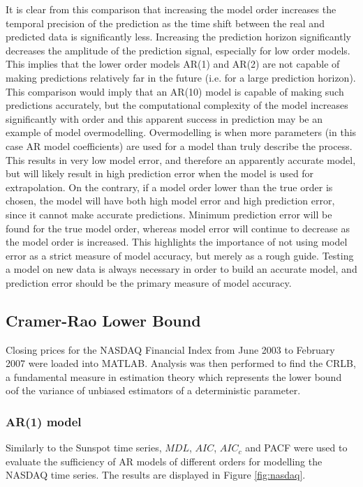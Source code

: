 \noindent
It is clear from this comparison that increasing the model order increases the temporal precision of the prediction as the time shift between the real and predicted data is significantly less. Increasing the prediction horizon significantly decreases the amplitude of the prediction signal, especially for low order models. This implies that the lower order models AR(1) and AR(2) are not capable of making predictions relatively far in the future (i.e. for a large prediction horizon). This comparison would imply that an AR(10) model is capable of making such predictions accurately, but the computational complexity of the model increases significantly with order and this apparent success in prediction may be an example of model overmodelling. Overmodelling is when more parameters (in this case AR model coefficients) are used for a model than truly describe the process. This results in very low model error, and therefore an apparently accurate model, but will likely result in high prediction error when the model is used for extrapolation. On the contrary, if a model order lower than the true order is chosen, the model will have both high model error and high prediction error, since it cannot make accurate predictions. Minimum prediction error will be found for the true model order, whereas model error will continue to decrease as the model order is increased. This highlights the importance of not using model error as a strict measure of model accuracy, but merely as a rough guide. Testing a model on new data is always necessary in order to build an accurate model, and prediction error should be the primary measure of model accuracy.

\subsection{Cramer-Rao Lower Bound}

Closing prices for the NASDAQ Financial Index from June 2003 to February 2007 were loaded into MATLAB. Analysis was then performed to find the CRLB, a fundamental measure in estimation theory which represents the lower bound oof the variance of unbiased estimators of a deterministic parameter.

\subsubsection{AR(1) model}

Similarly to the Sunspot time series, $MDL$, $AIC$, $AIC_{c}$ and PACF were used to evaluate the sufficiency of AR models of different orders for modelling the NASDAQ time series. The results are displayed in Figure \ref{fig:nasdaq}.

